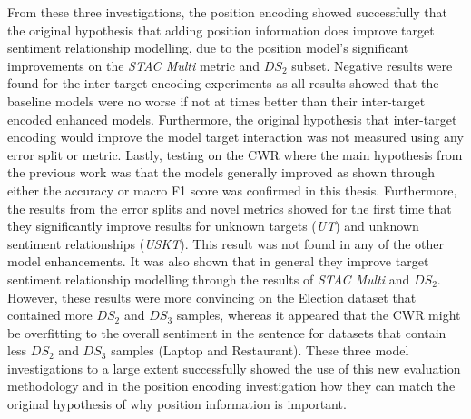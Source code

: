 From these three investigations, the position encoding showed successfully that the original hypothesis that adding position information does improve target sentiment relationship modelling, due to the position model's significant improvements on the \textit{STAC Multi} metric and $DS_2$ subset. Negative results were found for the inter-target encoding experiments as all results showed that the baseline models were no worse if not at times better than their inter-target encoded enhanced models. Furthermore, the original hypothesis that inter-target encoding would improve the model target interaction was not measured using any error split or metric. Lastly, testing on the CWR where the main hypothesis from the previous work was that the models generally improved as shown through either the accuracy or macro F1 score was confirmed in this thesis. Furthermore, the results from the error splits and novel metrics showed for the first time that they significantly improve results for unknown targets (\textit{UT}) and unknown sentiment relationships (\textit{USKT}). This result was not found in any of the other model enhancements. It was also shown that in general they improve target sentiment relationship modelling through the results of \textit{STAC Multi} and $DS_2$. However, these results were more convincing on the Election dataset that contained more $DS_2$ and $DS_3$ samples, whereas it appeared that the CWR might be overfitting to the overall sentiment in the sentence for datasets that contain less $DS_2$ and $DS_3$ samples (Laptop and Restaurant). These three model investigations to a large extent successfully showed the use of this new evaluation methodology and in the position encoding investigation how they can match the original hypothesis of why position information is important. %

